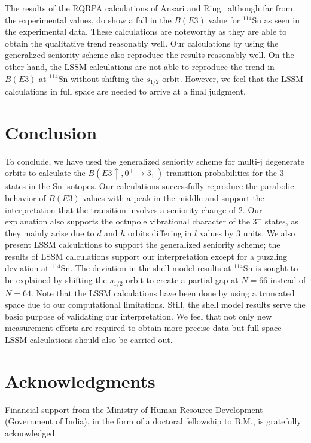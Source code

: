 \documentclass[twocolumn,showpacs,showkeys,preprintnumbers,amsmath,amssymb]{revtex4}
\begin{document}
The results of the RQRPA calculations of Ansari and Ring~\cite{ansari} although far from the experimental values, do show a fall in the $B(E3)$ value for $^{114}$Sn as seen in the experimental data. These calculations are noteworthy as they are able to obtain the qualitative trend reasonably well. Our calculations by using the generalized seniority scheme also reproduce the results reasonably well. On the other hand, the LSSM calculations are not able to reproduce the trend in $B(E3)$ at $^{114}$Sn without shifting the $s_{1/2}$ orbit. However, we feel that the LSSM calculations in full space are needed to arrive at a final judgment.   

\section{Conclusion}

To conclude, we have used the generalized seniority scheme for multi-j degenerate orbits to calculate the $B(E3 \uparrow,0^+ \rightarrow 3_1^-)$ transition probabilities for the $3^-$ states in the Sn-isotopes. Our calculations successfully reproduce the parabolic behavior of $B(E3)$ values with a peak in the middle and support the interpretation that the transition involves a seniority change of $2$. Our explanation also supports the octupole vibrational character of the $3^-$ states, as they mainly arise due to $d$ and $h$ orbits differing in $l$ values by $3$ units. We also present LSSM calculations to support the generalized seniority scheme; the results of LSSM calculations support our interpretation except for a puzzling deviation at $^{114}$Sn. The deviation in the shell model results at $^{114}$Sn is sought to be explained by shifting the $s_{1/2}$ orbit to create a partial gap at $N=66$ instead of $N=64$. Note that the LSSM calculations have been done by using a truncated space due to our computational limitations. Still, the shell model results serve the basic purpose of validating our interpretation. We feel that not only new measurement efforts are required to obtain more precise data but full space LSSM calculations should also be carried out.

\section*{Acknowledgments}

Financial support from the Ministry of Human Resource Development (Government of India), in the form of a doctoral fellowship to B.M., is gratefully acknowledged.
\end{document}
